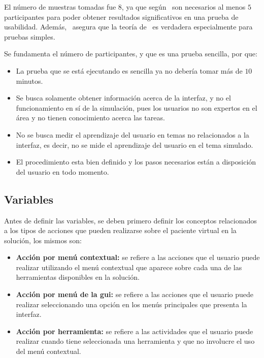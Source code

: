 El número de muestras tomadas fue 8, ya que según~\cite{nielsen2000} son
necesarios al menos $5$ participantes para poder obtener resultados
significativos en una prueba de usabilidad. Además,~\cite{ritch2009} asegura que
la teoría de~\cite{nielsen2000} es verdadera especialmente para pruebas simples. 

Se fundamenta el número de participantes, y que es una prueba sencilla, por que:

\begin{itemize}

\item La prueba que se está ejecutando es sencilla ya no debería tomar más de $10$
    minutos.

\item Se busca solamente obtener información acerca de la interfaz, y no el
    funcionamiento en sí de la simulación, pues los usuarios no son expertos en
    el área y no tienen conocimiento acerca las tareas.

\item No se busca medir el aprendizaje del usuario en temas no relacionados a la
    interfaz, es decir, no se mide el aprendizaje del usuario en el tema
    simulado.

\item El procedimiento esta bien definido y los pasos necesarios están a
    disposición del usuario en todo momento.

\end{itemize}

\subsection{Variables}
\label{sec:evaluacion_interfaz_variables}

Antes de definir las variables, se deben primero definir los conceptos 
relacionados a los tipos de acciones que pueden realizarse sobre el paciente 
virtual en la solución, los mismos son:

\begin{itemize}
\item \textbf{Acción por menú contextual:} se refiere a las acciones que el usuario 
    puede realizar utilizando el menú contextual que aparece sobre cada una de las
    herramientas disponibles en la solución.
\item \textbf{Acción por menú de la \Gls{gui}:} se refiere a las 
    acciones que el usuario puede realizar seleccionando una opción en los menús 
    principales que presenta la interfaz.
\item \textbf{Acción por herramienta:} se refiere a las actividades que el usuario 
    puede realizar cuando tiene seleccionada una herramienta y que no involucre el 
    uso del menú contextual.
\end{itemize}


